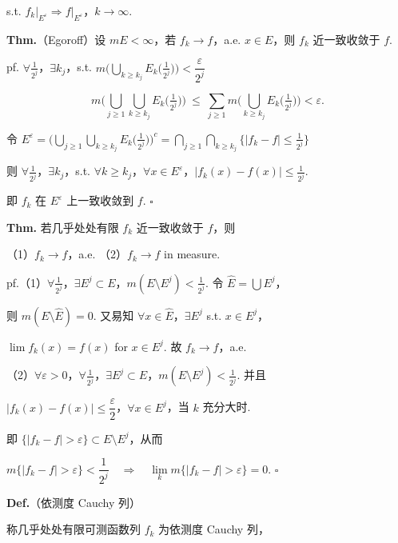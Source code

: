 \documentclass[11pt]{ctexart}
\theoremstyle{definition}
\begin{document}
s.t. $f_k\big\vert_{E^\varepsilon} \Rightarrow f\big\vert_{E^\varepsilon}$，$k \to \infty$.

\textbf{Thm.}（Egoroff）设 $mE < \infty$，若 $f_k \to f$，a.e. $x \in E$，则 $f_k$ 近一致收敛于 $f$.

pf. $\forall \tfrac{1}{2^j}$，$\exists k_j$，s.t. $m\Big(\bigcup\limits_{k \geq k_j} E_k\big(\tfrac{1}{2^j}\big)\Big) < \dfrac{\varepsilon}{2^j}$

\[
m\Big(\bigcup_{j \geq 1} \bigcup_{k \geq k_j} E_k\big(\tfrac{1}{2^j}\big)\Big) \ \leq\ \sum_{j \geq 1} m\Big(\bigcup_{k \geq k_j} E_k\big(\tfrac{1}{2^j}\big)\Big) < \varepsilon.
\]

令 $E^\varepsilon = \Big(\bigcup\limits_{j \geq 1} \bigcup\limits_{k \geq k_j} E_k\big(\tfrac{1}{2^j}\big)\Big)^c = \bigcap\limits_{j \geq 1} \bigcap\limits_{k \geq k_j} \Big\{\vert f_k - f\vert \leq \tfrac{1}{2^j}\Big\}$

则 $\forall \tfrac{1}{2^j}$，$\exists k_j$，s.t. $\forall k \geq k_j$，$\forall x \in E^\varepsilon$，$\vert f_k(x) - f(x)\vert \leq \tfrac{1}{2^j}$.

即 $f_k$ 在 $E^\varepsilon$ 上一致收敛到 $f$. $\square$

\textbf{Thm.} 若几乎处处有限 $f_k$ 近一致收敛于 $f$，则

（1）$f_k \to f$，a.e.  （2）$f_k \to f$ in measure.

pf.（1）$\forall \tfrac{1}{2^j}$，$\exists E^j \subset E$，$m(E \setminus E^j) < \tfrac{1}{2^j}$. 令 $\widehat{E} = \bigcup E^j$，

则 $m(E \setminus \widehat{E}) = 0$. 又易知 $\forall x \in \widehat{E}$，$\exists E^j$ s.t. $x \in E^j$，

$\lim f_k(x) = f(x)$ for $x \in E^j$. 故 $f_k \to f$，a.e.

（2）$\forall \varepsilon > 0$，$\forall \tfrac{1}{2^j}$，$\exists E^j \subset E$，$m(E \setminus E^j) < \tfrac{1}{2^j}$. 并且

$\vert f_k(x) - f(x)\vert \leq \dfrac{\varepsilon}{2}$，$\forall x \in E^j$，当 $k$ 充分大时.

即 $\{\vert f_k - f\vert > \varepsilon\} \subset E \setminus E^j$，从而

$m\{\vert f_k - f\vert > \varepsilon\} < \dfrac{1}{2^j} \quad \Rightarrow \quad \lim\limits_k m\{\vert f_k - f\vert > \varepsilon\} = 0.$ $\square$

\textbf{Def.}（依测度 Cauchy 列）

称几乎处处有限可测函数列 $f_k$ 为依测度 Cauchy 列，
\end{document}
